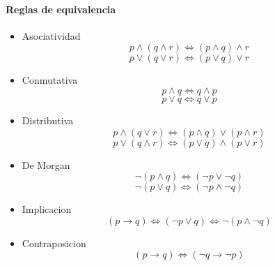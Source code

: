 \documentclass[a4paper]{article}
\begin{document}
\paragraph{Reglas de equivalencia}
\begin{itemize}

\item{Asociatividad}
	\begin{equation}
		p \wedge (q \wedge r) \Leftrightarrow (p \wedge q) \wedge r
	\end{equation}
	\begin{equation}
	p \vee (q \vee r) \Leftrightarrow (p \vee q) \vee r
	\end{equation}
\item{Conmutativa}
	\begin{equation}
		p \wedge q \Leftrightarrow q \wedge p
	\end{equation}
	\begin{equation}
		p \vee q \Leftrightarrow q \vee p
	\end{equation}
\item{Distributiva}
	\begin{equation}
		p \wedge (q \vee r) \Leftrightarrow (p \wedge q) \vee (p \wedge r)
	\end{equation}
	\begin{equation}
		p \vee (q \wedge r) \Leftrightarrow (p \vee q) \wedge (p \vee r)
	\end{equation}
\item{De Morgan}
	\begin{equation}
		\neg(p \wedge q) \Leftrightarrow ( \neg p \vee \neg q)
	\end{equation}
	\begin{equation}
		\neg(p \vee q) \Leftrightarrow ( \neg p \wedge \neg q)
	\end{equation}
\item{Implicacion}
	\begin{equation}
 		(p \rightarrow q) \Leftrightarrow (\neg p \vee q) \Leftrightarrow \neg(p \wedge \neg q)
	\end{equation}
\item{Contraposicion}
	\begin{equation}
		(p \rightarrow q) \Leftrightarrow (\neg q \rightarrow \neg p)
	\end{equation}
\end{itemize}
\end{document}
